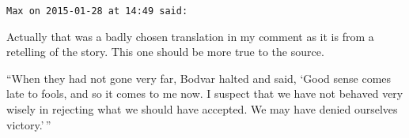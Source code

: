 \begin{footnotesize}
\begin{sffamily}
\hfill

\texttt{Max on 2015-01-28 at 14:49 said:}

Actually that was a badly chosen translation in my comment as it is from a retelling of the story. This one should be more true to the source.

``When they had not gone very far, Bodvar halted and said, `Good sense comes late to fools, and so it comes to me now. I suspect that we have not behaved very wisely in rejecting what we should have accepted. We may have denied ourselves victory.'\,''

\hfill

\end{sffamily}
\end{footnotesize}

